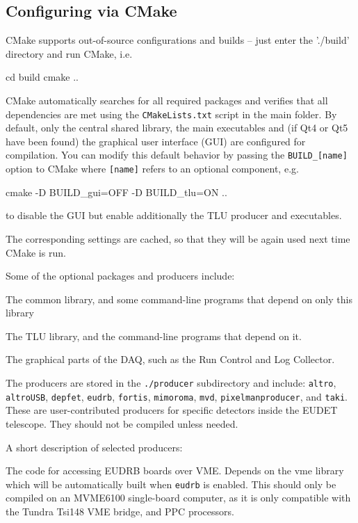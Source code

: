 \subsection{Configuring via CMake}
CMake supports out-of-source configurations and builds -- just enter
the './build' directory and run CMake, i.e.
\begin{listing}[mybash]
cd build
cmake ..
\end{listing}

CMake automatically searches for all required packages and verifies
that all dependencies are met using the \texttt{CMakeLists.txt} script in the
main folder. By default, only the central shared library, the main
executables and (if Qt4 or Qt5 have been found) the graphical user
interface (GUI) are configured for compilation. You can modify this
default behavior by passing the \texttt{BUILD\_[name]} option to
CMake where \texttt{[name]} refers to an optional component, e.g.
\begin{listing}[mybash]
cmake -D BUILD_gui=OFF -D BUILD_tlu=ON ..
\end{listing}
to disable the GUI but enable additionally the TLU producer and
executables.

The corresponding settings are cached, so that they will be again used
next time CMake is run.

Some of the optional packages and producers include:
\begin{description}

The common library, and some command-line programs that depend on only this library

The TLU library, and the command-line programs that depend on it.

The graphical parts of the DAQ, such as the Run Control and Log Collector.

\end{description}

The producers are stored in the \texttt{./producer} subdirectory and
include: \texttt{altro}, \texttt{altroUSB}, \texttt{depfet},
\texttt{eudrb}, \texttt{fortis}, \texttt{mimoroma}, \texttt{mvd},
\texttt{pixelmanproducer}, and \texttt{taki}. These are
user-contributed producers for specific detectors inside the EUDET
telescope.  They should not be compiled unless needed.

A short description of selected producers:
\begin{description}

The code for accessing EUDRB boards over VME.  Depends
on the vme library which will be automatically built
when \texttt{eudrb} is enabled. This should only be compiled on an
MVME6100 single-board computer, as it is only compatible with the
Tundra Tsi148 VME bridge, and PPC processors.
\end{description}



